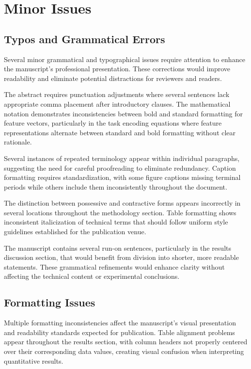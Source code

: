 \section{Minor Issues}
\label{sec:minor_issues}

\subsection{Typos and Grammatical Errors}
Several minor grammatical and typographical issues require attention to enhance the manuscript's professional presentation. These corrections would improve readability and eliminate potential distractions for reviewers and readers.

The abstract requires punctuation adjustments where several sentences lack appropriate comma placement after introductory clauses. The mathematical notation demonstrates inconsistencies between bold and standard formatting for feature vectors, particularly in the task encoding equations where feature representations alternate between standard and bold formatting without clear rationale.

Several instances of repeated terminology appear within individual paragraphs, suggesting the need for careful proofreading to eliminate redundancy. Caption formatting requires standardization, with some figure captions missing terminal periods while others include them inconsistently throughout the document.

The distinction between possessive and contractive forms appears incorrectly in several locations throughout the methodology section. Table formatting shows inconsistent italicization of technical terms that should follow uniform style guidelines established for the publication venue.

The manuscript contains several run-on sentences, particularly in the results discussion section, that would benefit from division into shorter, more readable statements. These grammatical refinements would enhance clarity without affecting the technical content or experimental conclusions.

\subsection{Formatting Issues}
Multiple formatting inconsistencies affect the manuscript's visual presentation and readability standards expected for publication. Table alignment problems appear throughout the results section, with column headers not properly centered over their corresponding data values, creating visual confusion when interpreting quantitative results.

